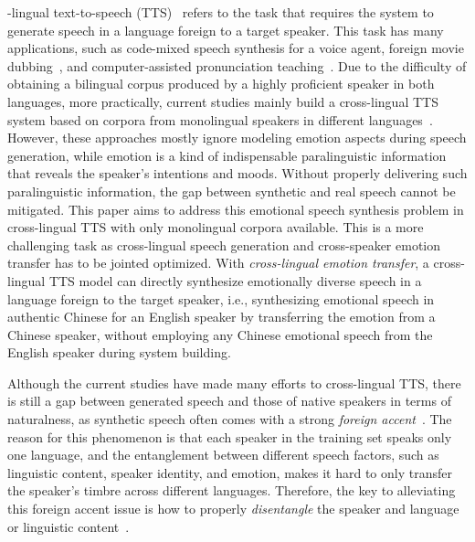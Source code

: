 \documentclass[journal,comsoc]{IEEEtran}
\begin{document}
-lingual text-to-speech (TTS)~\cite{zhang2019learning,rallabandi2017building,cai2023cross} refers to the task that requires the system to generate speech in a language foreign to a target speaker. This task has many applications, such as code-mixed speech synthesis for a voice agent, foreign movie dubbing~\cite{hu2021neural}, and computer-assisted pronunciation teaching~\cite{pourhosein2020using}.
Due to the difficulty of obtaining a bilingual corpus produced by a highly proficient speaker in both languages, more practically, current studies mainly build a cross-lingual TTS system based on corpora from monolingual speakers in different languages~\cite{9414226,xin2020cross,shang2021incorporating,ye2022improving}.
However, these approaches mostly ignore modeling emotion aspects during speech generation, while emotion is a kind of indispensable paralinguistic information that reveals the speaker's intentions and moods. 
Without properly delivering such paralinguistic information, the gap between synthetic and real speech cannot be mitigated.
This paper aims to address this emotional speech synthesis problem in cross-lingual TTS with only monolingual corpora available. 
This is a more challenging task as cross-lingual speech generation and cross-speaker emotion transfer has to be jointed optimized. 
With \textit{cross-lingual emotion transfer}, a cross-lingual TTS model can directly synthesize emotionally diverse speech in a language foreign to the target speaker, i.e., synthesizing emotional speech in authentic Chinese for an English speaker by transferring the emotion from a Chinese speaker, without employing any Chinese emotional speech from the English speaker during system building. 

Although the current studies have made many efforts to cross-lingual TTS, there is still a gap between generated speech and those of native speakers in terms of naturalness, as synthetic speech often comes with a strong \textit{foreign accent}~\cite{zhang2019learning}.
The reason for this phenomenon is that each speaker in the training set speaks only one language, and the entanglement between different speech factors, such as linguistic content, speaker identity, and emotion, makes it hard to only transfer the speaker's timbre across different languages.
Therefore, the key to alleviating this foreign accent issue is how to properly \textit{disentangle} the speaker and language or linguistic content~\cite{shang2021incorporating,ye2022improving,zhan22_interspeech}.
\end{document}

